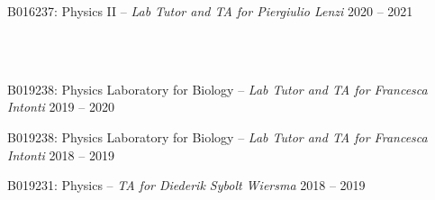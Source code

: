 \begin{cvcontent}
\begin{itemize*}[label=\textcolor{iconcolor}{\textbullet}]
    \item B016237: Physics II -- \emph{\small Lab Tutor and TA for Piergiulio Lenzi} \hfill {\normalsize \color{hlcolor-2} 2020 -- 2021}
  \end{itemize*}
  \\ [2.5mm]
  \\ [0.5mm]
  \begin{itemize*}[label=\textcolor{iconcolor}{\textbullet}]
    \item B019238: Physics Laboratory for Biology -- \emph{\small Lab Tutor and TA for Francesca Intonti} \hfill {\normalsize \color{hlcolor-2} 2019 -- 2020}\\ [0.5mm]
    \item B019238: Physics Laboratory for Biology -- \emph{\small Lab Tutor and TA for Francesca Intonti} \hfill {\normalsize \color{hlcolor-2} 2018 -- 2019}\\ [0.5mm]
    \item B019231: Physics -- \emph{\small TA for Diederik Sybolt Wiersma} \hfill {\normalsize \color{hlcolor-2} 2018 -- 2019}
  \end{itemize*}
\end{cvcontent}